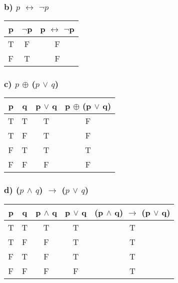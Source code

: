 \documentclass[11pt, oneside]{article} %
\numberwithin{equation}{section} %
\numberwithin{figure}{section} %
\numberwithin{table}{section} %
\begin{document}
\begin{table}[!htbp]
\subsubsection{b) $p$ $\leftrightarrow$ $\neg$$p$}
\begin{tabular}{c c c}
\hline\hline
p & $\neg$p &  p $\leftrightarrow$ $\neg$p \\ [0.5ex] 
\hline
T & F & F\\
F & T & F \\ [1ex]
\hline
\end{tabular}
\label{table:nonlin}
\end{table}

\begin{table}[!htbp]
\subsubsection{c) $p$ $\oplus$ ($p$  $\vee$ $q$)}
\begin{tabular}{c c c c}
\hline\hline
p & q &  p  $\vee$ q & p $\oplus$ (p  $\vee$ q) \\ [0.5ex] 
\hline
T & T & T & F\\
T & F & T & F \\
F & T & T & T \\
F & F & F & F\\ [1ex]
\hline
\end{tabular}
\label{table:nonlin}
\end{table}

\begin{table}[!htbp]
\subsubsection{d) ($p$  $\wedge$ $q$) $\rightarrow$ ($p$ $\vee$ $q$)}
\begin{tabular}{c c c c c}
\hline\hline
p & q & p  $\wedge$ q & p $\vee$ q & (p  $\wedge$ q) $\rightarrow$ (p $\vee$ q) \\ [0.5ex] 
\hline
T & T & T & T & T\\
T & F & F & T & T\\
F & T & F  & T & T\\
F & F & F & F & T\\ [1ex]
\hline
\end{tabular}
\label{table:nonlin}
\end{table}
\end{document}
